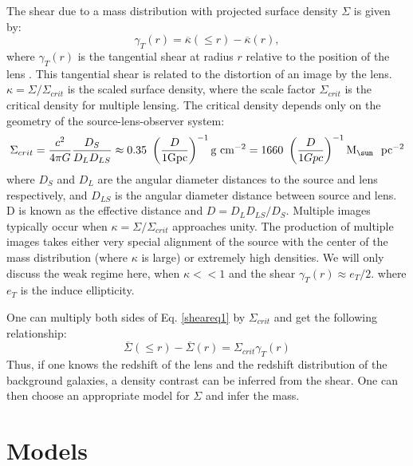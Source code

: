 \documentclass[preprint]{aastex}
\begin{document}
The shear due to a mass distribution with projected surface density
$\Sigma$ is given by:
\begin{equation} \label{sheareq1}
\gamma_T(r) = \overline{\kappa}(\leqslant r) - \overline{\kappa}(r),
\end{equation}
where $\gamma_T(r)$ is the tangential shear at radius $r$ relative 
to the position of the lens \citep{Escude91}.  This tangential shear is 
related to the 
distortion of an image by the lens.  $\kappa = \Sigma/\Sigma_{crit}$ is the 
scaled surface density, where the scale factor $\Sigma_{crit}$ is the critical
density for multiple lensing.  The critical density 
depends only on the geometry of the source-lens-observer system:
\begin{equation} \label{sigcriteq}
\Sigma_{crit} = { c^2 \over {4\pi G} } {D_S \over {D_L D_{LS}} } \approx
0.35\ \left( {D \over {1 \textrm{Gpc}}}\right)^{-1}\textrm{g\ cm$^{-2}$}
 = 1660 \ \left( {D \over {1 Gpc}}\right)^{-1} \textrm{M$_{\sun}$ \ pc$^{-2}$}
\end{equation}
where $D_S$ and $D_L$ are the angular diameter distances to the source and 
lens respectively, and $D_{LS}$ is the angular diameter distance between 
source and lens.  D is known as the effective distance 
and $D = D_L D_{LS}/D_S$.  Multiple images typically occur when 
$\kappa=\Sigma/\Sigma_{crit}$ approaches unity.  The production of multiple
images takes either very special alignment of the source with the center of 
the mass distribution (where $\kappa$ is large) or extremely high densities.
We will only discuss the weak regime here, when $\kappa << 1$ and the 
shear $\gamma_T(r) \approx e_T/2.$ where $e_T$ is the induce ellipticity.

One can multiply both sides of Eq. \ref{sheareq1} by $\Sigma_{crit}$ and get
the following relationship:
\begin{equation} \label{densecont}
\overline{\Sigma}(\leqslant r) - \overline{\Sigma}(r) = \Sigma_{crit} \gamma_T(r)
\end{equation}
Thus, if one knows the redshift of the lens and the redshift distribution of
the background galaxies, a density contrast can be inferred from the shear.
One can then choose an appropriate model for $\Sigma$ and infer the mass.

\section{Models}
\end{document}
